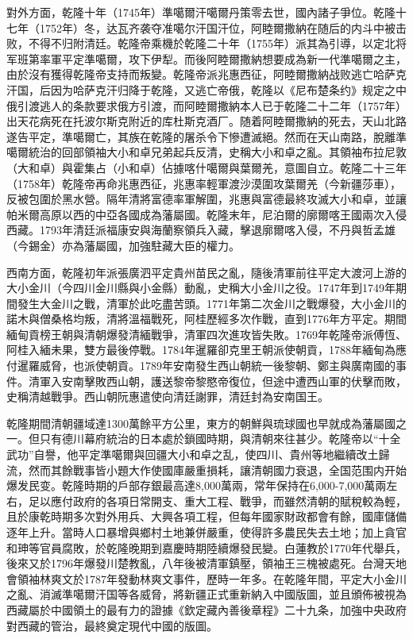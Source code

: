 對外方面，乾隆十年（1745年）準噶爾汗噶爾丹策零去世，國內諸子爭位。乾隆十七年（1752年）冬，达瓦齐袭夺准噶尔汗国汗位，阿睦爾撒納在随后的内斗中被击败，不得不归附清廷。乾隆帝乘機於乾隆二十年（1755年）派其為引導，以定北将军班第率軍平定準噶爾，攻下伊犁。而後阿睦爾撒納想要成為新一代準噶爾之主，由於沒有獲得乾隆帝支持而叛變。乾隆帝派兆惠西征，阿睦爾撒納战败逃亡哈萨克汗国，后因为哈萨克汗归降于乾隆，又逃亡帝俄，乾隆以《尼布楚条约》规定之中俄引渡逃人的条款要求俄方引渡，而阿睦爾撒納本人已于乾隆二十二年（1757年）出天花病死在托波尔斯克附近的库杜斯克酒厂。随着阿睦爾撒納的死去，天山北路遂告平定，準噶爾亡，其族在乾隆的屠杀令下慘遭滅絕。然而在天山南路，脫離準噶爾統治的回部領袖大小和卓兄弟起兵反清，史稱大小和卓之亂。其領袖布拉尼敦（大和卓）與霍集占（小和卓）佔據喀什噶爾與葉爾羌，意圖自立。乾隆二十三年（1758年）乾隆帝再命兆惠西征，兆惠率輕軍渡沙漠圍攻葉爾羌（今新疆莎車），反被包圍於黑水營。隔年清將富德率軍解圍，兆惠與富德最終攻滅大小和卓，並讓帕米爾高原以西的中亞各國成為藩屬國。乾隆末年，尼泊爾的廓爾喀王國兩次入侵西藏。1793年清廷派福康安與海蘭察領兵入藏，擊退廓爾喀入侵，不丹與哲孟雄（今錫金）亦為藩屬國，加強駐藏大臣的權力。

西南方面，乾隆初年派張廣泗平定貴州苗民之亂，隨後清軍前往平定大渡河上游的大小金川（今四川金川縣與小金縣）動亂，史稱大小金川之役。1747年到1749年期間發生大金川之戰，清軍於此吃盡苦頭。1771年第二次金川之戰爆發，大小金川的諾木與僧桑格均叛，清將溫福戰死，阿桂歷經多次作戰，直到1776年方平定。期間緬甸貢榜王朝與清朝爆發清緬戰爭，清軍四次進攻皆失敗。1769年乾隆帝派傅恆、阿桂入緬未果，雙方最後停戰。1784年暹羅卻克里王朝派使朝貢，1788年緬甸為應付暹羅威脅，也派使朝貢。1789年安南發生西山朝統一後黎朝、鄭主與廣南國的事件。清軍入安南擊敗西山朝，護送黎帝黎愍帝復位，但途中遭西山軍的伏擊而敗，史稱清越戰爭。西山朝阮惠遣使向清廷謝罪，清廷封為安南国王。

乾隆期間清朝疆域達1300萬餘平方公里，東方的朝鮮與琉球國也早就成為藩屬國之一。但只有德川幕府統治的日本處於鎖國時期，與清朝來往甚少。乾隆帝以“十全武功”自譽，他平定準噶爾與回疆大小和卓之乱，使四川、貴州等地繼續改土歸流，然而其餘戰事皆小題大作使國庫嚴重損耗，讓清朝國力衰退，全国范围内开始爆发民变。乾隆時期的戶部存銀最高達8,000萬兩，常年保持在6,000-7,000萬兩左右，足以應付政府的各項日常開支、重大工程、戰爭，而雖然清朝的賦稅較為輕，且於康乾時期多次對外用兵、大興各項工程，但每年國家財政都會有餘，國庫儲備逐年上升。當時人口暴增與鄉村土地兼併嚴重，使得許多農民失去土地；加上貪官和珅等官員腐敗，於乾隆晚期到嘉慶時期陸續爆發民變。白蓮教於1770年代舉兵，後來又於1796年爆發川楚教亂，八年後被清軍鎮壓，領袖王三槐被處死。台灣天地會領袖林爽文於1787年發動林爽文事件，歷時一年多。在乾隆年間，平定大小金川之亂、消滅準噶爾汗国等各威脅，將新疆正式重新納入中國版圖，並且頒佈被視為西藏屬於中國領土的最有力的證據《欽定藏內善後章程》二十九条，加強中央政府對西藏的管治，最終奠定現代中國的版圖。

